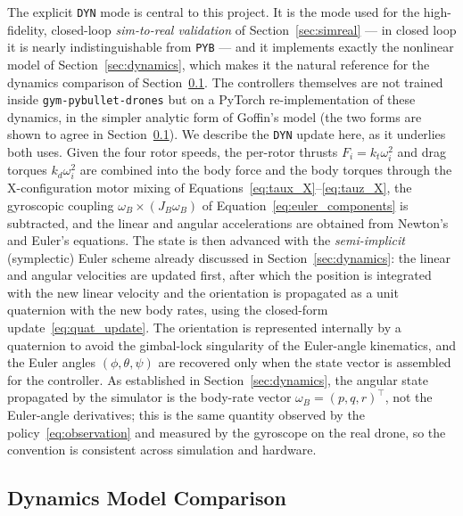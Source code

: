 \documentclass[11pt,a4paper]{article}
\theoremstyle{remark}
\numberwithin{equation}{section}
\begin{document}
The explicit \texttt{DYN} mode is central to this project. It is the mode used for
the high-fidelity, closed-loop \emph{sim-to-real validation} of
Section~\ref{sec:simreal} --- in closed loop it is nearly indistinguishable from
\texttt{PYB} --- and it implements exactly the nonlinear model of
Section~\ref{sec:dynamics}, which makes it the natural reference for the dynamics
comparison of Section~\ref{sec:dyn_comparison}. The controllers themselves are not
trained inside \texttt{gym-pybullet-drones} but on a PyTorch re-implementation of
these dynamics, in the simpler analytic form of Goffin's model (the two forms are
shown to agree in Section~\ref{sec:dyn_comparison}). We describe the \texttt{DYN}
update here, as it underlies both uses. Given the four rotor speeds, the
per-rotor thrusts $F_i = k_t\omega_i^2$ and drag torques $k_d\omega_i^2$ are
combined into the body force and the body torques through the
X-configuration motor mixing of Equations~\eqref{eq:taux_X}--\eqref{eq:tauz_X},
the gyroscopic coupling $\omega_B \times (J_B\omega_B)$ of
Equation~\eqref{eq:euler_components} is subtracted, and the linear and angular
accelerations are obtained from Newton's and Euler's equations. The state is then
advanced with the \emph{semi-implicit} (symplectic) Euler scheme already
discussed in Section~\ref{sec:dynamics}: the linear and angular velocities are
updated first, after which the position is integrated with the new linear
velocity and the orientation is propagated as a unit quaternion with the new
body rates, using the closed-form update~\eqref{eq:quat_update}. The orientation is represented internally by a quaternion
to avoid the gimbal-lock singularity of the Euler-angle kinematics, and the
Euler angles $(\phi,\theta,\psi)$ are recovered only when the state vector is
assembled for the controller. As established in Section~\ref{sec:dynamics}, the
angular state propagated by the simulator is the body-rate vector
$\omega_B = (p,q,r)^\top$, not the Euler-angle derivatives; this is the same
quantity observed by the policy~\eqref{eq:observation} and measured by the
gyroscope on the real drone, so the convention is consistent across simulation
and hardware.

\subsection{Dynamics Model Comparison}\label{sec:dyn_comparison}
\end{document}
